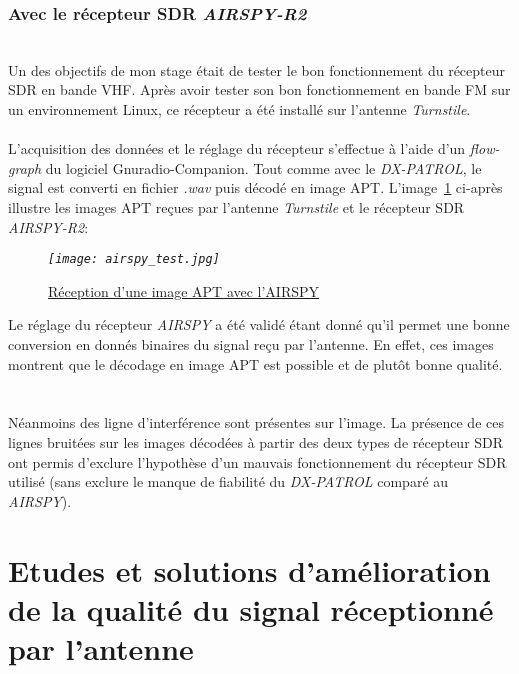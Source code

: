 \documentclass[12pt,fleqn]{book} %
\begin{document}
\subsection{Avec le récepteur SDR \emph{AIRSPY-R2}}
~\\Un des objectifs de mon stage était de tester le bon fonctionnement du récepteur SDR en bande VHF. Après avoir tester son bon fonctionnement en bande FM sur un environnement Linux, ce récepteur a été installé sur l'antenne \emph{Turnstile}.
~\\\\L'acquisition des données et le réglage du récepteur s'effectue à l'aide d'un \emph{flow-graph} du logiciel Gnuradio-Companion. Tout comme avec le \emph{DX-PATROL}, le signal est converti en fichier \emph{.wav} puis décodé en image APT. L'image~\underline{\color{blue}\ref{airspy_test}} ci-après illustre les images APT reçues par l'antenne \emph{Turnstile} et le récepteur SDR \emph{AIRSPY-R2}:
\begin{figure}[H]
	\centering
	\itshape
	\texttt{[image: airspy\_test.jpg]}
	\caption{\label{airspy_test} \underline{Réception d'une image APT avec l'AIRSPY}}
\end{figure}
Le réglage du récepteur \emph{AIRSPY} a été validé étant donné qu'il permet une bonne conversion en donnés binaires du signal reçu par l'antenne. En effet, ces images montrent que le décodage en image APT est possible et de plutôt bonne qualité.
~\\\\Néanmoins des ligne d'interférence sont présentes sur l'image. La présence de ces lignes bruitées sur les images décodées à partir des deux types de récepteur SDR ont permis d'exclure l'hypothèse d'un mauvais fonctionnement du récepteur SDR utilisé (sans exclure le manque de fiabilité du \emph{DX-PATROL} comparé au \emph{AIRSPY}). 
\chapter{Etudes et solutions d'amélioration de la qualité du signal réceptionné par l'antenne}
\end{document}

